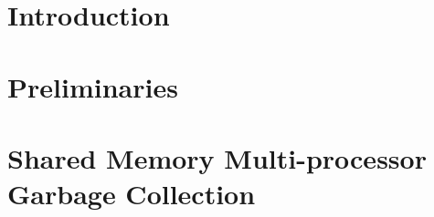 \documentclass[12pt,letterpaper]{report}
\begin{document}
 
 \pagebreak
 \begin{doublespace}
 	
 \newpage
   \begin{doublespace}
   
   \end{doublespace}
   \newpage
%

\renewcommand{\cftchapfont}{\normalfont}
\renewcommand{\cftchappagefont}{\normalfont}

\renewcommand{\cftsecpagefont}{\normalfont}
\renewcommand{\contentsname}{Table of Contents}
\setlength{\cftbeforetoctitleskip}{0 in}


\begin{singlespace}
\tableofcontents
\end{singlespace}


\newpage

\cleardoublepage

\newpage
{}
\begin{singlespace}
\listoffigures
\end{singlespace}


 \pagebreak
 
 


\chapter{Introduction}
\label{maininto}

\chapter{Preliminaries}
\label{prelim}


  \chapter{Shared Memory Multi-processor Garbage Collection}
 \label{shared}
   

\end{doublespace}
\end{document}
